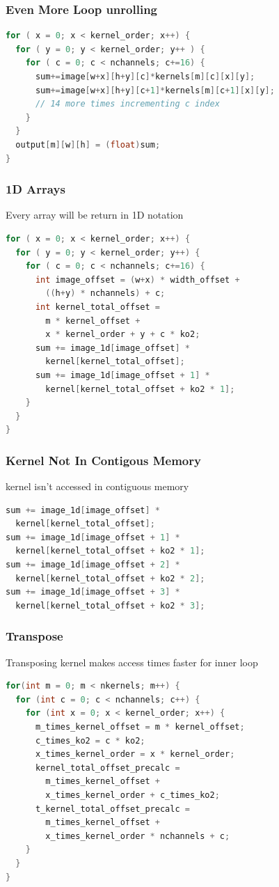 \documentclass{beamer}
\begin{document}
\begin{frame}[fragile]
\frametitle{Even More Loop unrolling}
\begin{lstlisting}[language=C,keywordstyle=\color{blue}]
for ( x = 0; x < kernel_order; x++) {
  for ( y = 0; y < kernel_order; y++ ) {
    for ( c = 0; c < nchannels; c+=16) {
      sum+=image[w+x][h+y][c]*kernels[m][c][x][y];
      sum+=image[w+x][h+y][c+1]*kernels[m][c+1][x][y];
      // 14 more times incrementing c index
    }
  }
  output[m][w][h] = (float)sum;
}
\end{lstlisting}
\end{frame}

\begin{frame}[fragile]
\frametitle{1D Arrays}
Every array will be return in 1D notation 
\begin{lstlisting}[language=C,keywordstyle=\color{blue}]
for ( x = 0; x < kernel_order; x++) {
  for ( y = 0; y < kernel_order; y++) {
    for ( c = 0; c < nchannels; c+=16) {
      int image_offset = (w+x) * width_offset + 
        ((h+y) * nchannels) + c;
      int kernel_total_offset = 
        m * kernel_offset + 
        x * kernel_order + y + c * ko2;
      sum += image_1d[image_offset] * 
        kernel[kernel_total_offset];
      sum += image_1d[image_offset + 1] * 
        kernel[kernel_total_offset + ko2 * 1];
    }
  }
}
\end{lstlisting}
\end{frame}

\begin{frame}[fragile]
\frametitle{Kernel Not In Contigous Memory}
kernel isn't accessed in contiguous memory
\begin{lstlisting}[language=C,keywordstyle=\color{blue}]
sum += image_1d[image_offset] * 
  kernel[kernel_total_offset];
sum += image_1d[image_offset + 1] * 
  kernel[kernel_total_offset + ko2 * 1];
sum += image_1d[image_offset + 2] * 
  kernel[kernel_total_offset + ko2 * 2];
sum += image_1d[image_offset + 3] * 
  kernel[kernel_total_offset + ko2 * 3];
\end{lstlisting}
\end{frame}

\begin{frame}[fragile]
\frametitle{Transpose}
Transposing kernel makes access times faster for inner loop
\begin{lstlisting}[language=C,keywordstyle=\color{blue}]
for(int m = 0; m < nkernels; m++) {
  for (int c = 0; c < nchannels; c++) {
    for (int x = 0; x < kernel_order; x++) {
      m_times_kernel_offset = m * kernel_offset;
      c_times_ko2 = c * ko2;
      x_times_kernel_order = x * kernel_order;
      kernel_total_offset_precalc = 
        m_times_kernel_offset + 
        x_times_kernel_order + c_times_ko2;
      t_kernel_total_offset_precalc = 
        m_times_kernel_offset + 
        x_times_kernel_order * nchannels + c;
    }
  } 
}
\end{lstlisting}
\end{frame}
\end{document}
